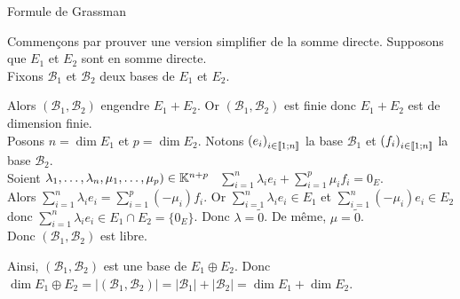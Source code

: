 \documentclass{article}
\begin{document}
	\begin{question_kholle}
		[Supposons $E$ de dimension finie. \\
		Soient $E_1$ et $E_2$ deux \sevs. Alors $E_1 + E_2$ est de dimension finie et
		\begin{equation}
			\dim E_1 + E_2 = \dim E_1 + \dim E_2 - \dim E_1 \cap E_2
		\end{equation}]
		{Formule de Grassman}
		
		Commençons par prouver une version simplifier de la somme directe. Supposons que $E_1$ et $E_2$ sont en somme directe. \\
		Fixons $\mathcal{B}_1$ et $\mathcal{B}_2$ deux bases de $E_1$ et $E_2$.
		
		Alors $\left(\mathcal{B}_1, \mathcal{B}_2\right)$ engendre $E_1 + E_2$. Or $\left(\mathcal{B}_1, \mathcal{B}_2\right)$ est finie donc $E_1 + E_2$ est de dimension finie. \\
		Posons $n = \dim E_1$ et $p = \dim E_2$. Notons $\left(e_i\right)_{i \in [\![ 1 ; n ]\!]}$ la base $\mathcal{B}_1$ et $\left(f_i\right)_{i \in [\![ 1 ; n ]\!]}$ la base $\mathcal{B}_2$. \\
		Soient $\lambda_1, \ldots, \lambda_n, \mu_1, \ldots, \mu_p) \in \mathbb K^{n+p}$ \fqs \fqs \ $\displaystyle \sum_{i=1}^{n} \lambda_i e_i + \sum_{i=1}^{p} \mu_i f_i = 0_E$. \\
		Alors $\sum_{i=1}^{n} \lambda_i e_i = \sum_{i=1}^{p} (-\mu_i) f_i$.
		Or $\sum_{i=1}^{n} \lambda_i e_i \in E_1$ et $\sum_{i=1}^{n} (-\mu_i) e_i \in E_2$ donc $\sum_{i=1}^{n} \lambda_i e_i \in E_1 \cap E_2 = \{0_E\}$.
		Donc $\lambda = \tilde{0}$. De même, $\mu = \tilde{0}$. \\
		Donc $\left(\mathcal{B}_1, \mathcal{B}_2\right)$ est libre.
		
		Ainsi, $\left(\mathcal{B}_1, \mathcal{B}_2\right)$ est une base de $E_1 \oplus E_2$.
		Donc $ \dim E_1 \oplus E_2 = |(\mathcal{B}_1, \mathcal{B}_2)| = |\mathcal{B}_1| + |\mathcal{B}_2| = \dim E_1 + \dim E_2$. \\
		

\end{question_kholle}
\end{document}

